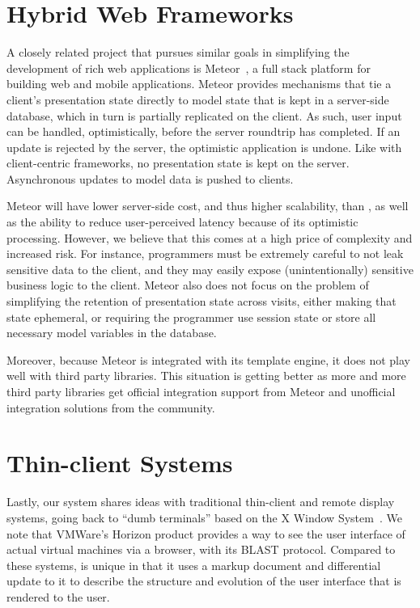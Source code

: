 \section{Hybrid Web Frameworks}
A closely related project that pursues similar goals in simplifying the development
of rich web applications is Meteor~\cite{meteor}, a full stack platform for building 
web and mobile applications.  Meteor provides mechanisms that tie a client's presentation
state directly to model state that is kept in a server-side database, which in turn is 
partially replicated on the client.  As such, user input can be handled, optimistically, before 
the server roundtrip has completed. If an update is rejected by the server, the optimistic 
application is undone. Like with client-centric frameworks, no presentation state is kept on
the server. Asynchronous updates to model data is pushed to clients.

Meteor will have lower server-side cost, and thus higher scalability, than \cb, as well
as the ability to reduce user-perceived latency because of its optimistic processing.
However, we believe that this comes at a high price of complexity and increased risk.
For instance, programmers must be extremely careful to not leak sensitive data to the 
client, and they may easily expose (unintentionally) sensitive business logic to the client.  
Meteor also does not focus on the problem of simplifying the retention of presentation
state across visits, either making that state ephemeral, or requiring the programmer
use session state or store all necessary model variables in the database.

Moreover, because Meteor is integrated with its template engine, it does not play well
with third party \js libraries. This situation is getting better as more and more third
party libraries get official integration support from Meteor and unofficial integration
solutions from the community.


\section{Thin-client Systems}

Lastly, our system shares ideas with traditional thin-client and remote display 
systems, going back to ``dumb terminals'' based on the X Window 
System~\cite{ScheiflerGettys:acmtg1986}.  We note that VMWare's Horizon product provides
a way to see the user interface of actual virtual machines via a browser, with its
BLAST protocol.  Compared to these systems, \cb{} is 
unique in that it uses a markup document and differential update to it to 
describe the structure and evolution of the user interface that is rendered 
to the user.  
